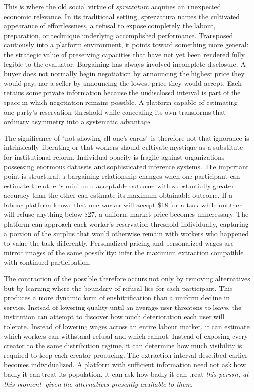 \documentclass[11pt]{article}
\begin{document}
This is where the old social virtue of \emph{sprezzatura} \citep{castiglione1528courtier} acquires an unexpected economic relevance. In its traditional setting, sprezzatura names the cultivated appearance of effortlessness, a refusal to expose completely the labour, preparation, or technique underlying accomplished performance. Transposed cautiously into a platform environment, it points toward something more general: the strategic value of preserving capacities that have not yet been rendered fully legible to the evaluator. Bargaining has always involved incomplete disclosure. A buyer does not normally begin negotiation by announcing the highest price they would pay, nor a seller by announcing the lowest price they would accept. Each retains some private information because the undisclosed interval is part of the space in which negotiation remains possible. A platform capable of estimating one party's reservation threshold while concealing its own transforms that ordinary asymmetry into a systematic advantage.

The significance of ``not showing all one's cards'' is therefore not that ignorance is intrinsically liberating or that workers should cultivate mystique as a substitute for institutional reform. Individual opacity is fragile against organizations possessing enormous datasets and sophisticated inference systems. The important point is structural: a bargaining relationship changes when one participant can estimate the other's minimum acceptable outcome with substantially greater accuracy than the other can estimate its maximum obtainable outcome. If a labour platform knows that one worker will accept \$18 for a task while another will refuse anything below \$27, a uniform market price becomes unnecessary. The platform can approach each worker's reservation threshold individually, capturing a portion of the surplus that would otherwise remain with workers who happened to value the task differently. Personalized pricing and personalized wages are mirror images of the same possibility: infer the maximum extraction compatible with continued participation.

The contraction of the possible therefore occurs not only by removing alternatives but by learning where the boundary of refusal lies for each participant. This produces a more dynamic form of enshittification than a uniform decline in service. Instead of lowering quality until an average user threatens to leave, the institution can attempt to discover how much deterioration each user will tolerate. Instead of lowering wages across an entire labour market, it can estimate which workers can withstand refusal and which cannot. Instead of exposing every creator to the same distribution regime, it can determine how much visibility is required to keep each creator producing. The extraction interval described earlier becomes individualized. A platform with sufficient information need not ask how badly it can treat its population. It can ask how badly it can treat \emph{this person, at this moment, given the alternatives presently available to them}.
\end{document}
